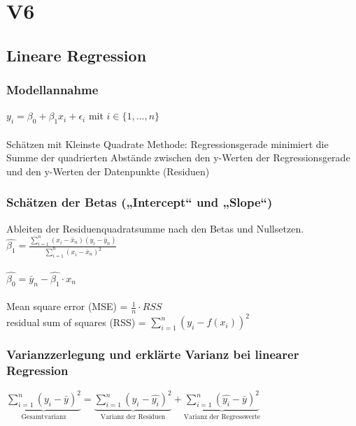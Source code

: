 \section{V6}
\subsection{Lineare Regression}
\subsubsection{Modellannahme}
$y_i = \beta_0 + \beta_1 x_i + \epsilon_i$ mit $i \in \{1, ... , n\}$\\\\
Schätzen mit Kleinste Quadrate Methode: Regressionsgerade minimiert die Summe der quadrierten Abstände zwischen den y-Werten der Regressionsgerade und den y-Werten der Datenpunkte (Residuen)

\subsubsection{Schätzen der Betas („Intercept“ und „Slope“)}
Ableiten der Residuenquadratsumme nach den Betas und Nullsetzen.\\
$\hat{\beta_1}=\frac{\displaystyle \sum_{i=1}^{n} (x_i - \bar{x}_n)(y_i - \bar{y}_n)}{\displaystyle \sum_{i=1}^{n} (x_i - \bar{x}_n)^2}$\\\\
$\hat{\beta_0}= \bar{y}_n - \hat{\beta_1} \cdot x_n$\\\\

Mean square error (MSE) = $\frac{1}{n} \cdot RSS$\\
residual sum of squares (RSS) = $\displaystyle \sum_{i=1}^{n} (y_i - f(x_i))^2$

\subsubsection{Varianzzerlegung und erklärte Varianz bei linearer Regression}
$\displaystyle \underbrace{\sum_{i=1}^{n} (y_i - \bar{y})^2}_{\text{Gesamtvarianz}} = \displaystyle \underbrace{\sum_{i=1}^{n} (y_i - \hat{y_i})^2}_{\text{Varianz der Residuen}} + \displaystyle \underbrace{\sum_{i=1}^{n} (\hat{y_i} - \bar{y})^2}_{\text{Varianz der Regresswerte}}$

